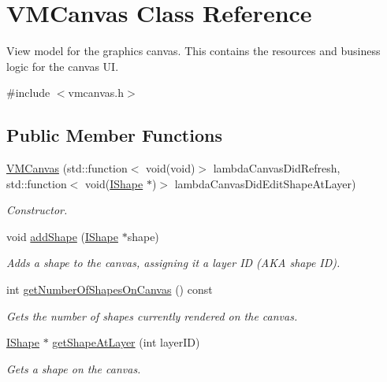 \hypertarget{class_v_m_canvas}{}\section{V\+M\+Canvas Class Reference}
\label{class_v_m_canvas}


View model for the graphics canvas. This contains the resources and business logic for the canvas UI.  




{\ttfamily \#include $<$vmcanvas.\+h$>$}

\subsection*{Public Member Functions}
\begin{DoxyCompactItemize}
\item 
\mbox{\hyperlink{class_v_m_canvas_a82b848f9bd6e7fac849fdf1096bfb682}{V\+M\+Canvas}} (std\+::function$<$ void(void)$>$ lambda\+Canvas\+Did\+Refresh, std\+::function$<$ void(\mbox{\hyperlink{class_i_shape}{I\+Shape}} $\ast$)$>$ lambda\+Canvas\+Did\+Edit\+Shape\+At\+Layer)
\begin{DoxyCompactList}\small\item\em Constructor. \end{DoxyCompactList}\item 
void \mbox{\hyperlink{class_v_m_canvas_a1dafa7eb89dc594c677a4570475c9d39}{add\+Shape}} (\mbox{\hyperlink{class_i_shape}{I\+Shape}} $\ast$shape)
\begin{DoxyCompactList}\small\item\em Adds a shape to the canvas, assigning it a layer ID (A\+KA shape ID). \end{DoxyCompactList}\item 
int \mbox{\hyperlink{class_v_m_canvas_a92907a64db6ce0b762490f1846ef4abe}{get\+Number\+Of\+Shapes\+On\+Canvas}} () const
\begin{DoxyCompactList}\small\item\em Gets the number of shapes currently rendered on the canvas. \end{DoxyCompactList}\item 
\mbox{\hyperlink{class_i_shape}{I\+Shape}} $\ast$ \mbox{\hyperlink{class_v_m_canvas_aa0d7e62214392970b7e229f25b5d270b}{get\+Shape\+At\+Layer}} (int layer\+ID)
\begin{DoxyCompactList}\small\item\em Gets a shape on the canvas. \end{DoxyCompactList}\item 

\end{DoxyCompactItemize}
